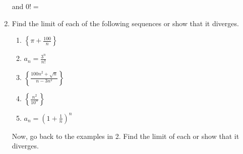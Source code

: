 \documentclass[11pt,fleqn]{article}
\newcommand{\ds}{\displaystyle}
\begin{document}
\begin{enumerate}
\vspace{0.5in}
and $0!=$
\medskip
\item Find the limit of each of the following sequences or show that it diverges. 
	\begin{enumerate}
	\item $\displaystyle \left\{\pi + \frac{100}{n} \right\}$
	\vfill
	\item $\ds a_n=\frac{3^n}{n!}$
	\vfill
	\item $\displaystyle \left\{\frac{100n^2+\sqrt{n}}{n-3n^2} \right\}$
	\vfill
	\item $\displaystyle \left\{\frac{n^2}{10^n} \right\}$
	\vfill
	\item $\displaystyle a_n = \left(1+\frac{1}{n}\right)^n$
	\vfill
	\end{enumerate}
Now, go back to the examples in 2. Find the limit of each or show that it diverges.

\end{enumerate}
\end{document}
